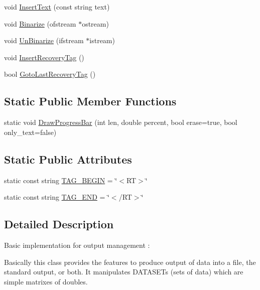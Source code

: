 \begin{DoxyCompactItemize}
\item 
void \hyperlink{classelps_1_1_lab_outputer_a21ecad21d95ea286a717a5ec029ee299}{Insert\+Text} (const string text)
\item 
void \hyperlink{classelps_1_1_lab_outputer_a4a850317a26a30c441b3e913a4bb05f6}{Binarize} (ofstream $\ast$ostream)
\item 
void \hyperlink{classelps_1_1_lab_outputer_a7b9213f0a5bf47ecdf4b87c4ad7757b4}{Un\+Binarize} (ifstream $\ast$istream)
\item 
void \hyperlink{classelps_1_1_lab_outputer_a8adf798e914942e87bd19980fa8084ac}{Insert\+Recovery\+Tag} ()
\item 
bool \hyperlink{classelps_1_1_lab_outputer_a2c8d775a4f18203f4e767053b983771c}{Goto\+Last\+Recovery\+Tag} ()
\end{DoxyCompactItemize}
\subsection*{Static Public Member Functions}
\begin{DoxyCompactItemize}
\item 
static void \hyperlink{classelps_1_1_lab_outputer_ad497e25cf7a65db54bb2a1ccdce54e06}{Draw\+Progress\+Bar} (int len, double percent, bool erase=true, bool only\+\_\+text=false)
\end{DoxyCompactItemize}
\subsection*{Static Public Attributes}
\begin{DoxyCompactItemize}
\item 
static const string \hyperlink{classelps_1_1_lab_outputer_a107166b500ff05595a207c23986249bf}{T\+A\+G\+\_\+\+B\+E\+G\+I\+N} = \char`\"{}$<$R\+T$>$\char`\"{}
\item 
static const string \hyperlink{classelps_1_1_lab_outputer_abf6d3e96248aa72b662627b8bc1b7c91}{T\+A\+G\+\_\+\+E\+N\+D} = \char`\"{}$<$/R\+T$>$\char`\"{}
\end{DoxyCompactItemize}


\subsection{Detailed Description}
Basic implementation for output management \+:

Basically this class provides the features to produce output of data into a file, the standard output, or both. It manipulates D\+A\+T\+A\+S\+E\+Ts (sets of data) which are simple matrixes of doubles.

